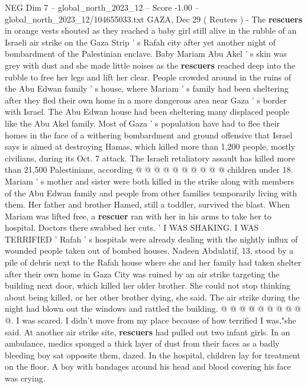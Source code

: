 \begin{textsample}{NEG Dim 7 – global\_north\_2023\_12 – Score -1.00 – global\_north\_2023\_12/104655033.txt}  \label{ex:f7_neg_306}
GAZA, Dec 29 ( Reuters ) - The \textbf{rescuers} in orange vests shouted as they reached a baby girl still alive in the rubble of an Israeli air strike on the Gaza Strip ' s Rafah city after yet another night of bombardment of the Palestinian enclave.
Baby Mariam Abu Akel ' s skin was grey with dust and she made little noises as the \textbf{rescuers} reached deep into the rubble to free her legs and lift her clear.
People crowded around in the ruins of the Abu Edwan family ' s house, where Mariam ' s family had been sheltering after they fled their own home in a more dangerous area near Gaza ' s border with Israel.
The Abu Edwan house had been sheltering many displaced people like the Abu Akel family.
Most of Gaza ' s population have had to flee their homes in the face of a withering bombardment and ground offensive that Israel says is aimed at destroying Hamas, which killed more than 1,200 people, mostly civilians, during its Oct. 7 attack.
The Israeli retaliatory assault has killed more than 21,500 Palestinians, according @ @ @ @ @ @ @ @ @ @ children under 18.
Mariam ' s mother and sister were both killed in the strike along with members of the Abu Edwan family and people from other families temporarily living with them.
Her father and brother Hamed, still a toddler, survived the blast.
When Mariam was lifted free, a \textbf{rescuer} ran with her in his arms to take her to hospital.
Doctors there swabbed her cuts. ' I WAS SHAKING.
I WAS TERRIFIED ' Rafah ' s hospitals were already dealing with the nightly influx of wounded people taken out of bombed houses.
Nadeen Abdulatif, 13, stood by a pile of debris next to the Rafah house where she and her family had taken shelter after their own home in Gaza City was ruined by an air strike targeting the building next door, which killed her older brother.
She could not stop thinking about being killed, or her other brother dying, she said.
The air strike during the night had blown out the windows and rattled the building. @ @ @ @ @ @ @ @ @ @.
I was scared.
I didn't move from my place because of how terrified I was,"she said.
At another air strike site, \textbf{rescuers} had pulled out two infant girls.
In an ambulance, medics sponged a thick layer of dust from their faces as a badly bleeding boy sat opposite them, dazed.
In the hospital, children lay for treatment on the floor.
A boy with bandages around his head and blood covering his face was crying.

\end{textsample}
